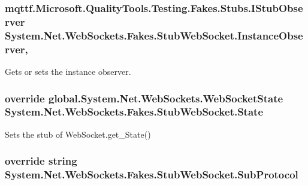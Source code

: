 \hypertarget{class_system_1_1_net_1_1_web_sockets_1_1_fakes_1_1_stub_web_socket_a649ceaff825fb3c465ada3caa0ccc787}{
\subsubsection[{Instance\-Observer}]{\setlength{\rightskip}{0pt plus 5cm}mqttf.\-Microsoft.\-Quality\-Tools.\-Testing.\-Fakes.\-Stubs.\-I\-Stub\-Observer System.\-Net.\-Web\-Sockets.\-Fakes.\-Stub\-Web\-Socket.\-Instance\-Observer\hspace{0.3cm}{\ttfamily [get]}, {\ttfamily [set]}}}\label{class_system_1_1_net_1_1_web_sockets_1_1_fakes_1_1_stub_web_socket_a649ceaff825fb3c465ada3caa0ccc787}


Gets or sets the instance observer.

\hypertarget{class_system_1_1_net_1_1_web_sockets_1_1_fakes_1_1_stub_web_socket_a555ef8c91e210bae55ff5dd7c97615e4}{
\subsubsection[{State}]{\setlength{\rightskip}{0pt plus 5cm}override global.\-System.\-Net.\-Web\-Sockets.\-Web\-Socket\-State System.\-Net.\-Web\-Sockets.\-Fakes.\-Stub\-Web\-Socket.\-State\hspace{0.3cm}{\ttfamily [get]}}}\label{class_system_1_1_net_1_1_web_sockets_1_1_fakes_1_1_stub_web_socket_a555ef8c91e210bae55ff5dd7c97615e4}


Sets the stub of Web\-Socket.\-get\-\_\-\-State()

\hypertarget{class_system_1_1_net_1_1_web_sockets_1_1_fakes_1_1_stub_web_socket_a388a75107628c227d9d3bc8267f9f3b0}{
\subsubsection[{Sub\-Protocol}]{\setlength{\rightskip}{0pt plus 5cm}override string System.\-Net.\-Web\-Sockets.\-Fakes.\-Stub\-Web\-Socket.\-Sub\-Protocol\hspace{0.3cm}{\ttfamily [get]}}}\label{class_system_1_1_net_1_1_web_sockets_1_1_fakes_1_1_stub_web_socket_a388a75107628c227d9d3bc8267f9f3b0}


